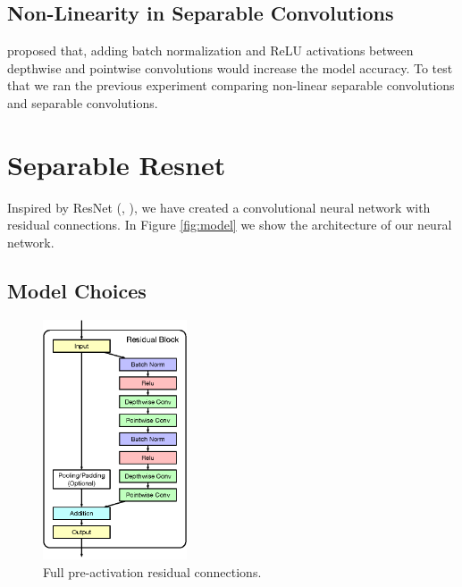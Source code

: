 \subsection{Non-Linearity in Separable Convolutions}
\cite{howard2017mobilenets} proposed that, adding batch normalization and ReLU activations between depthwise and pointwise convolutions would increase the model accuracy. To test that we ran the previous experiment comparing non-linear separable convolutions and separable convolutions.



\section{Separable Resnet}
Inspired by ResNet (\cite{He:2015aa}, \cite{he2016identity}), we have created a convolutional neural network with residual connections. In Figure \ref{fig:model} we show the architecture of our neural network. 


\subsection{Model Choices}
\begin{figure}
\vspace{-65px}
\begin{center}
\includegraphics[width=0.38\textwidth]{images/full_preactivation.eps}
\end{center}
\caption{Full pre-activation residual connections.}
\label{fig:full-preactivation}
\end{figure}

